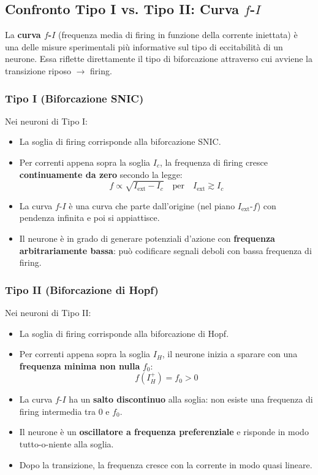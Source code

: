 \subsection{Confronto Tipo I vs. Tipo II: Curva $f$-$I$}


La \textbf{curva $f$-$I$} (frequenza media di firing in funzione della corrente iniettata) è una delle misure sperimentali più informative sul tipo di eccitabilità di un neurone. Essa riflette direttamente il tipo di biforcazione attraverso cui avviene la transizione riposo $\rightarrow$ firing.

\subsubsection{Tipo I (Biforcazione SNIC)}

Nei neuroni di Tipo I:
\begin{itemize}
    \item La soglia di firing corrisponde alla biforcazione SNIC.
    \item Per correnti appena sopra la soglia $I_c$, la frequenza di firing cresce \textbf{continuamente da zero} secondo la legge:
    \begin{equation}
    f \propto \sqrt{I_{\text{ext}} - I_c} \quad \text{per} \quad I_{\text{ext}} \gtrsim I_c
    \end{equation}
    \item La curva $f$-$I$ è una curva che parte dall'origine (nel piano $I_{\text{ext}}$-$f$) con pendenza infinita e poi si appiattisce.
    \item Il neurone è in grado di generare potenziali d'azione con \textbf{frequenza arbitrariamente bassa}: può codificare segnali deboli con bassa frequenza di firing.
\end{itemize}

\subsubsection{Tipo II (Biforcazione di Hopf)}

Nei neuroni di Tipo II:
\begin{itemize}
    \item La soglia di firing corrisponde alla biforcazione di Hopf.
    \item Per correnti appena sopra la soglia $I_H$, il neurone inizia a sparare con una \textbf{frequenza minima non nulla} $f_0$:
    \begin{equation}
    f(I_H^+) = f_0 > 0
    \end{equation}
    \item La curva $f$-$I$ ha un \textbf{salto discontinuo} alla soglia: non esiste una frequenza di firing intermedia tra 0 e $f_0$.
    \item Il neurone è un \textbf{oscillatore a frequenza preferenziale} e risponde in modo tutto-o-niente alla soglia.
    \item Dopo la transizione, la frequenza cresce con la corrente in modo quasi lineare.
\end{itemize}

